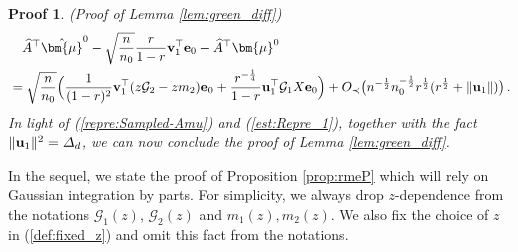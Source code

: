 \documentclass[12pt]{article}
\numberwithin{equation}{section}
\newtheorem{myPro}{Proof}
\theoremstyle{remark}
\newcommand{\1}{{\rm 1}\kern-0.24em{\rm I}}
\begin{document}
\begin{appendices}
\begin{myPro}{(Proof of Lemma \ref{lem:green_diff})}
\begin{align}\label{repre:Sampled-Amu}
&\quad \widehat{A} ^{\top} \hat{\bm{\mu}}^0- \sqrt{\frac{n}{n_0}} \frac{r}{1-r} {\bf v}_1^{\top} {\bf e}_0 - \widehat{A} ^{\top} {\bm{\mu}}^0\notag\\
&= \sqrt{\frac{n}{n_0}} \Big( \frac{1}{(1-r)^2} {\bf v}_1^{\top}(z\mathcal{G}_2-zm_2){\bf e}_0+ \frac{r^{-\frac 14}}{1-r} {\bf u}_1^{\top}\mathcal{G}_1 {X}{\bf e}_0\Big)+   O_\prec \big(n^{-\frac 12} n_0^{-\frac 12} r^{\frac 12} ( r^{\frac 12} + \Vert {\bf u}_1\Vert)\big)\,.
\end{align}
In light of   (\ref{repre:Sampled-Amu}) and (\ref{est:Repre_1}), together with the fact $\Vert {\bf u}_1 \Vert^2 = \varDelta_d$, we can now conclude the proof of Lemma \ref{lem:green_diff}.
\end{myPro}


In the sequel, we state the proof of Proposition \ref{prop:rmeP} which  will rely on  Gaussian integration by parts. For simplicity, we always drop $z$-dependence  from the notations $\mathcal{G}_1(z)$, $\mathcal{G}_2(z)$ and $m_1(z), m_2 (z)$. We also fix the choice of $z$ in  (\ref{def:fixed_z}) and omit this fact from the notations.



\end{appendices}
\end{document}
